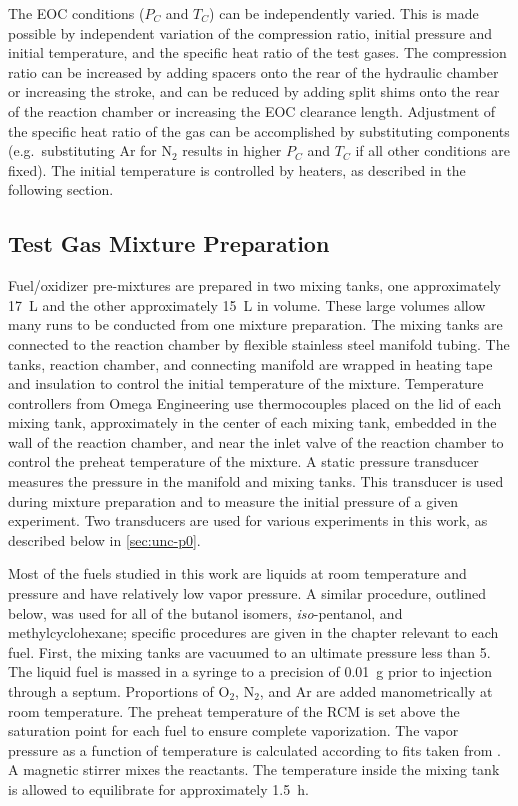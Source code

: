 \documentclass[../main.tex]{subfiles}
\begin{document}
The EOC conditions ($P_C$ and $T_C$) can be independently varied. This
is made possible by independent variation of the compression ratio,
initial pressure and initial temperature, and the specific heat ratio
of the test gases. The compression ratio can be
increased by adding spacers onto the rear of the hydraulic chamber or
increasing the stroke, and can be reduced by adding split shims onto
the rear of the reaction chamber or increasing the EOC clearance length.
Adjustment of the specific heat ratio of the gas can be accomplished
by substituting components (e.g.\ substituting Ar for N$_2$ results in
higher $P_C$ and $T_C$ if all other conditions are fixed). The initial
temperature is controlled by heaters, as described in the following
section.

\subsection{Test Gas Mixture Preparation}

Fuel/oxidizer pre-mixtures are prepared in two mixing tanks, one approximately
\SI{17}{\liter} and the other approximately \SI{15}{\liter} in volume. These large volumes allow many
runs to be conducted from one mixture preparation. The mixing tanks are connected
to the reaction chamber by flexible stainless steel manifold tubing. The tanks, reaction chamber,
and connecting manifold are wrapped in heating tape and insulation to control the initial
temperature of the mixture. Temperature controllers from Omega Engineering use thermocouples
placed on the lid of each mixing tank, approximately in the center of each mixing tank, embedded in
the wall of the reaction chamber, and near the inlet valve of the reaction chamber to control the
preheat temperature of the mixture. A static pressure transducer
measures the pressure in the manifold and mixing tanks. This transducer is used
during mixture preparation and to measure the initial pressure of a given experiment.
Two transducers are used for various experiments in this work, as described below
in \cref{sec:unc-p0}.

Most of the fuels studied in this work are liquids at room temperature and
pressure and have relatively low vapor pressure. A similar procedure, outlined
below, was used for all of the butanol isomers, \textit{iso}-pentanol, and
methylcyclohexane; specific procedures are given in the chapter relevant to
each fuel. First, the mixing tanks are vacuumed to an ultimate pressure
less than \SI{5}{\torr}. The liquid fuel is massed in a syringe to a precision of
\SI{0.01}{\gram} prior to injection through a septum. Proportions of O$_2$, N$_2$, and
Ar are added manometrically at room temperature. The preheat temperature of
the RCM is set above the saturation point for each fuel to ensure complete
vaporization. The vapor pressure as a function of temperature is calculated
according to fits taken from \textcite{Yaws1999}. A magnetic stirrer mixes
the reactants. The temperature inside the mixing tank is allowed to
equilibrate for approximately \SI{1.5}{\hour}.
\end{document}
